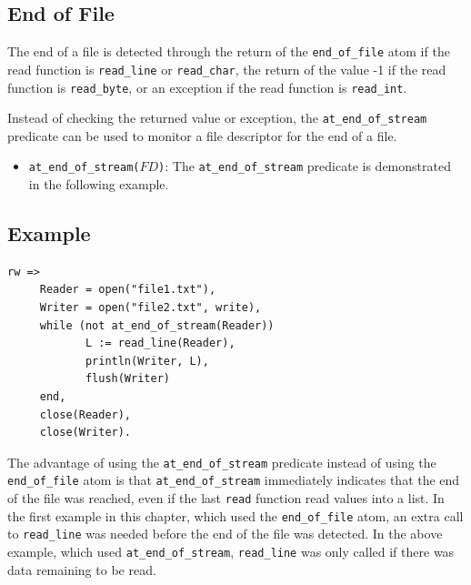 \subsection{End of File}
The end of a file is detected through the return of the \texttt{end\_of\_file} atom if the read function is \texttt{read\_line} or \texttt{read\_char}, the return of the value -1 if the read function is \texttt{read\_byte}, or an exception if the read function is \texttt{read\_int}.
Instead of checking the returned value or exception, the \texttt{at\_end\_of\_stream} predicate can be used to monitor a file descriptor for the end of a file.

\begin{itemize}
\item \texttt{at\_end\_of\_stream($FD$)}: The \texttt{at\_end\_of\_stream} predicate is demonstrated in the following example. 
\end{itemize}

\subsection*{Example}
\begin{verbatim}
rw =>
     Reader = open("file1.txt"),
     Writer = open("file2.txt", write),
     while (not at_end_of_stream(Reader))
            L := read_line(Reader),
            println(Writer, L),
            flush(Writer)
     end,
     close(Reader),
     close(Writer).
\end{verbatim}

The advantage of using the \texttt{at\_end\_of\_stream} predicate instead of using the \newline \texttt{end\_of\_file} atom is that \texttt{at\_end\_of\_stream} immediately indicates that the end of the file was reached, even if the last \texttt{read} function read values into a list. In the first example in this chapter, which used the \texttt{end\_of\_file} atom, an extra call to \texttt{read\_line} was needed before the end of the file was detected.  In the above example, which used \texttt{at\_end\_of\_stream}, \texttt{read\_line} was only called if there was data remaining to be read.

